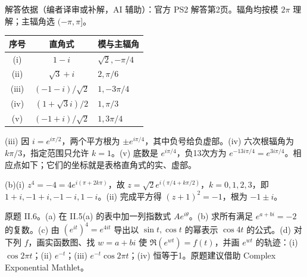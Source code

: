 \begin{solution}
解答依据（编者译审或补解，AI 辅助）：官方 PS2 解答第2页。辐角均按模 $2\pi$ 理解；主辐角选 $(-\pi,\pi]$。
\begin{center}\begin{tabular}{ccl}序号&直角式&模与主辐角\\\hline
(i)&$1-i$&$\sqrt2,-\pi/4$\\
(ii)&$\sqrt3+i$&$2,\pi/6$\\
(iii)&$(-1-i)/\sqrt2$&$1,-3\pi/4$\\
(iv)&$(1+\sqrt3 i)/2$&$1,\pi/3$\\
(v)&$(-1+i)/\sqrt2$&$1,3\pi/4$\\
\end{tabular}\end{center}
(iii) 因 $i=e^{i\pi/2}$，两个平方根为 $\pm e^{i\pi/4}$，其中负号给负虚部。(iv) 六次根辐角为 $k\pi/3$，指定范围只允许 $k=1$。(v) 底数是 $e^{i\pi/4}$，负13次方为 $e^{-13i\pi/4}=e^{3i\pi/4}$。相应点如下；它们的坐标就是表格直角式的实、虚部。
\begin{center}\end{center}
(b)(i) $z^4=-4=4e^{i(\pi+2k\pi)}$，故 $z=\sqrt2e^{i(\pi/4+k\pi/2)}$，$k=0,1,2,3$，即 $1+i,-1+i,-1-i,1-i$。(ii) 完成平方得 $(z+1)^2=-1$，根为 $-1\pm i$。
\end{solution}
\begin{exercise}\label{cw:ps2-II-6}
原题 II.6。(a) 在 II.5(a) 的表中加一列指数式 $Ae^{i\theta}$。(b) 求所有满足 $e^{a+bi}=-2$ 的复数。(c) 由 $(e^{it})^4=e^{4it}$ 导出以 $\sin t,\cos t$ 的幂表示 $\cos4t$ 的公式。(d) 对下列 $f$，画实函数图、找 $w=a+bi$ 使 $\Re(e^{wt})=f(t)$，并画 $e^{wt}$ 的轨迹：(i) $\cos2\pi t$；(ii) $e^{-t}$；(iii) $e^{-t}\cos2\pi t$；(iv) 恒等于1。原题建议借助 Complex Exponential Mathlet。
\end{exercise}
